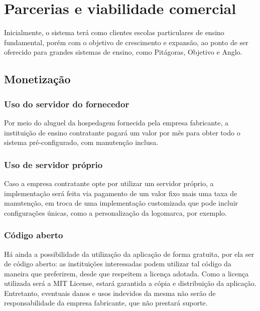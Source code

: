 \chapter{Parcerias e viabilidade comercial}
Inicialmente, o sistema terá como clientes escolas particulares de ensino fundamental, porém com o objetivo de crescimento e expansão, ao ponto de ser oferecido para grandes sistemas de ensino, como Pitágoras, Objetivo e Anglo.

\section{Monetização}
\subsection{Uso do servidor do fornecedor}
Por meio do aluguel da hospedagem fornecida pela empresa fabricante, a instituição de ensino contratante pagará um valor por mês para obter todo o sistema pré-configurado, com manutenção inclusa.

\subsection{Uso de servidor próprio}
Caso a empresa contratante opte por utilizar um servidor próprio, a implementação será feita via pagamento de um valor fixo mais uma taxa de manutenção, em troca de uma implementação customizada que pode incluir configurações únicas, como a personalização da logomarca, por exemplo.

\subsection{Código aberto}
Há ainda a possibilidade da utilização da aplicação de forma gratuita, por ela ser de código aberto: as instituições interessadas podem utilizar tal código da maneira que preferirem, desde que respeitem a licença adotada. Como a licença utilizada será a MIT License, estará garantida a cópia e distribuição da aplicação. Entretanto, eventuais danos e usos indevidos da mesma não serão de responsabilidade da empresa fabricante, que não prestará suporte.